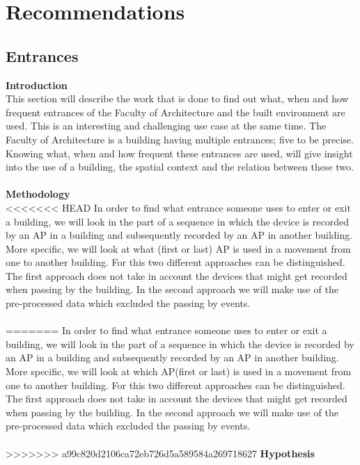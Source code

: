 \chapter{Recommendations}\label{recommendations}
\section{Entrances}
\textbf{Introduction}\label{intro}\\
This section will describe the work that is done to find out what, when and how frequent entrances of the Faculty of Architecture and the built environment are used. This is an interesting and challenging use case at the same time. The Faculty of Architecture is a building having multiple entrances; five to be precise. Knowing what, when and how frequent these entrances are used, will give insight into the use of a building, the spatial context and the relation between these two.\\\\
\textbf{Methodology}\label{method}\\
<<<<<<< HEAD
In order to find what entrance someone uses to enter or exit a building, we will look in the part of a sequence in which the device is recorded by an AP in a building and subsequently recorded by an AP in another building. More specific, we will look at what (first or last) AP is used in a movement from one to another building. For this two different approaches can be distinguished. The first approach does not take in account the devices that might get recorded when passing by the building. In  the second approach we will make use of the pre-processed data which excluded the passing by events.\\\\
=======
In order to find what entrance someone uses to enter or exit a building, we will look in the part of a sequence in which the device is recorded by an AP in a building and subsequently recorded by an AP in another building. More specific, we will look at which AP(first or last) is used in a movement from one to another building. For this two different approaches can be distinguished. The first approach does not take in account the devices that might get recorded when passing by the building. In  the second approach we will make use of the pre-processed data which excluded the passing by events.\\\\
>>>>>>> a99c820d2106ca72eb726d5a589584a269718627
\textbf{Hypothesis}\label{hypo}\\
